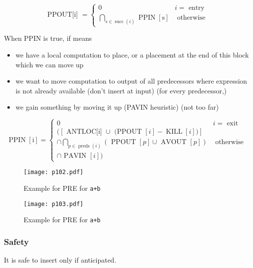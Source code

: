 $$
	\text { PPOUT[i] }=\left\{\begin{array}{cl}
		0                                                                      & i=\text { entry }   \\
		\bigcap_{s \in \operatorname{succ}(i)} \operatorname{PPIN}[\mathrm{s}] & \text { otherwise }
	\end{array}\right.
$$


When PPIN is true, if means
\begin{itemize}
	\item we have a local computation to place, or a placement at the end of this block which we can move up
	\item  we want to move computation to output of all predecessors where expression is not already available (don’t insert at input) (for every predecessor,)
	\item we gain something by moving it up (PAVIN heuristic) (not too far)
\end{itemize}

$$
	\operatorname{PPIN}[\mathrm{i}]=\left\{\begin{array}{cc}
		0                                                                                   & i=\text { exit }    \\
		([\text { ANTLOC[i] } \cup \text { (PPOUT }[i]-\operatorname{KILL}[i])]             &                     \\
		\cap \bigcap_{p \in \text { preds }(i)}(\text { PPOUT }[p] \cup \text { AVOUT }[p]) & \text { otherwise } \\
		\cap \text { PAVIN }[i])                                                            &
	\end{array}\right.
$$




\begin{figure}[H]
	\centering
	\texttt{[image: p102.pdf]}
	\caption{Example for PRE for \texttt{a+b}}
	\label{fig:p102}
\end{figure}

\begin{figure}[H]
	\centering
	\texttt{[image: p103.pdf]}
	\caption{Example for PRE for \texttt{a+b}}
	\label{fig:p103}
\end{figure}
\subsubsection{Safety}

It is  safe to insert only if anticipated.

